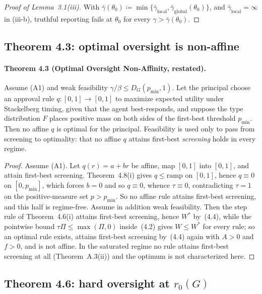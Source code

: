 \documentclass[acmsmall,nonacm,screen]{acmart}
\theoremstyle{acmplain}%
\theoremstyle{acmdefinition}%
\numberwithin{equation}{section}
\begin{document}
\begin{appendix}
\begin{proof}[Proof of Lemma~3.1(iii)]
With $\bar\gamma(\theta_0)\coloneqq\min\{\bar\gamma_{\mathrm{local}},\bar\gamma_{\mathrm{global}}(\theta_0)\}$, and $\bar\gamma_{\mathrm{local}}=\infty$ in (iii-b), truthful reporting fails at $\theta_0$ for every $\gamma>\bar\gamma(\theta_0)$.
\end{proof}


\subsection{Theorem 4.3: optimal oversight is non-affine}

\paragraph*{Theorem 4.3 (Optimal Oversight Non-Affinity, restated).}
Assume (A1) and weak feasibility $\gamma/\beta \le D_G(p_{\min},1)$. Let the principal choose an approval rule $q : [0,1] \to [0,1]$ to maximize expected utility under Stackelberg timing, given that the agent best-responds, and suppose the type distribution $F$ places positive mass on both sides of the first-best threshold $p_{\min}$. Then no affine $q$ is optimal for the principal. Feasibility is used only to pass from screening to optimality: that no affine $q$ attains first-best \emph{screening} holds in every regime.

\begin{proof}
Assume (A1). Let $q(r)=a+br$ be affine, map $[0,1]$ into $[0,1]$, and attain first-best screening. Theorem~4.8(i) gives $q\leq\mathrm{ramp}$ on $[0,1]$, hence $q\equiv0$ on $[0,p_{\min}]$, which forces $b=0$ and so $q\equiv0$, whence $\tau\equiv0$, contradicting $\tau=1$ on the positive-measure set $p>p_{\min}$. So no affine rule attains first-best screening, and this half is regime-free. Assume in addition weak feasibility. Then the step rule of Theorem~4.6(i) attains first-best screening, hence $W^*$ by~(4.4), while the pointwise bound $\tau\Pi\leq\max(\Pi,0)$ inside~(4.2) gives $W\leq W^*$ for every rule; so an optimal rule exists, attains first-best screening by~(4.4) again with $A>0$ and $f>0$, and is not affine. In the saturated regime no rule attains first-best screening at all (Theorem~A.3(ii)) and the optimum is not characterized here.
\end{proof}


\subsection{Theorem 4.6: hard oversight at $r_0(G)$}


\end{appendix}
\end{document}
